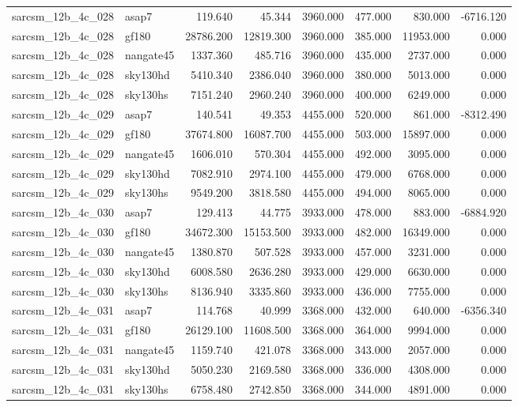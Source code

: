 \begin{tabular}{llrrrrrr}
sarcsm\_12b\_4c\_028 & asap7 & 119.640 & 45.344 & 3960.000 & 477.000 & 830.000 & -6716.120 \\
sarcsm\_12b\_4c\_028 & gf180 & 28786.200 & 12819.300 & 3960.000 & 385.000 & 11953.000 & 0.000 \\
sarcsm\_12b\_4c\_028 & nangate45 & 1337.360 & 485.716 & 3960.000 & 435.000 & 2737.000 & 0.000 \\
sarcsm\_12b\_4c\_028 & sky130hd & 5410.340 & 2386.040 & 3960.000 & 380.000 & 5013.000 & 0.000 \\
sarcsm\_12b\_4c\_028 & sky130hs & 7151.240 & 2960.240 & 3960.000 & 400.000 & 6249.000 & 0.000 \\
sarcsm\_12b\_4c\_029 & asap7 & 140.541 & 49.353 & 4455.000 & 520.000 & 861.000 & -8312.490 \\
sarcsm\_12b\_4c\_029 & gf180 & 37674.800 & 16087.700 & 4455.000 & 503.000 & 15897.000 & 0.000 \\
sarcsm\_12b\_4c\_029 & nangate45 & 1606.010 & 570.304 & 4455.000 & 492.000 & 3095.000 & 0.000 \\
sarcsm\_12b\_4c\_029 & sky130hd & 7082.910 & 2974.100 & 4455.000 & 479.000 & 6768.000 & 0.000 \\
sarcsm\_12b\_4c\_029 & sky130hs & 9549.200 & 3818.580 & 4455.000 & 494.000 & 8065.000 & 0.000 \\
sarcsm\_12b\_4c\_030 & asap7 & 129.413 & 44.775 & 3933.000 & 478.000 & 883.000 & -6884.920 \\
sarcsm\_12b\_4c\_030 & gf180 & 34672.300 & 15153.500 & 3933.000 & 482.000 & 16349.000 & 0.000 \\
sarcsm\_12b\_4c\_030 & nangate45 & 1380.870 & 507.528 & 3933.000 & 457.000 & 3231.000 & 0.000 \\
sarcsm\_12b\_4c\_030 & sky130hd & 6008.580 & 2636.280 & 3933.000 & 429.000 & 6630.000 & 0.000 \\
sarcsm\_12b\_4c\_030 & sky130hs & 8136.940 & 3335.860 & 3933.000 & 436.000 & 7755.000 & 0.000 \\
sarcsm\_12b\_4c\_031 & asap7 & 114.768 & 40.999 & 3368.000 & 432.000 & 640.000 & -6356.340 \\
sarcsm\_12b\_4c\_031 & gf180 & 26129.100 & 11608.500 & 3368.000 & 364.000 & 9994.000 & 0.000 \\
sarcsm\_12b\_4c\_031 & nangate45 & 1159.740 & 421.078 & 3368.000 & 343.000 & 2057.000 & 0.000 \\
sarcsm\_12b\_4c\_031 & sky130hd & 5050.230 & 2169.580 & 3368.000 & 336.000 & 4308.000 & 0.000 \\
sarcsm\_12b\_4c\_031 & sky130hs & 6758.480 & 2742.850 & 3368.000 & 344.000 & 4891.000 & 0.000 \\

\end{tabular}
